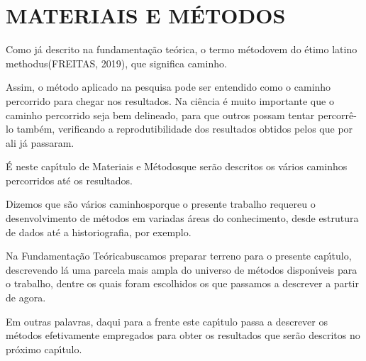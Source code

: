 \documentclass[
12pt,		%
openright,	%
twoside,  %
a4paper,			%
chapter=TITLE,		%
english,			%
french,				%
spanish,			%
brazil				%
]{USPSC-classe/USPSC_RedarTex}
\begin{document}
\chapter[MATERIAIS E M\'ETODOS]{MATERIAIS E M\'ETODOS}\label{MATERIAIS E M\'ETODOS}
Como j\'a descrito na fundamenta\c{c}\~ao te\'orica, o termo \textquotedbl m\'etodo\textquotedbl  vem do \'etimo latino \textquotedbl methodus\textquotedbl   (FREITAS, 2019), que significa \textquotedbl caminho\textquotedbl .








Assim, o m\'etodo aplicado na pesquisa pode ser entendido como o caminho percorrido para chegar nos resultados. Na ci\^encia \'e muito importante que o caminho percorrido seja bem delineado, para que outros possam tentar percorr\^e-lo tamb\'em, verificando a reprodutibilidade dos resultados obtidos pelos que por ali j\'a passaram.








\'E neste cap\'{\i}tulo de \textquotedbl Materiais e M\'etodos\textquotedbl  que ser\~ao descritos os v\'arios caminhos percorridos at\'e os resultados.








Dizemos que s\~ao \textquotedbl v\'arios caminhos\textquotedbl  porque o presente trabalho requereu o desenvolvimento de m\'etodos em variadas \'areas do conhecimento, desde estrutura de dados at\'e a historiografia, por exemplo.








Na \textquotedbl Fundamenta\c{c}\~ao Te\'orica\textquotedbl  buscamos preparar terreno para o presente cap\'{\i}tulo, descrevendo l\'a uma parcela mais ampla do universo de m\'etodos dispon\'{\i}veis para o trabalho, dentre os quais foram escolhidos os que passamos a descrever a partir de agora.








Em outras palavras, daqui para a frente este cap\'{\i}tulo passa a descrever os m\'etodos efetivamente empregados para obter os resultados que ser\~ao descritos no pr\'oximo cap\'{\i}tulo.
\end{document}
